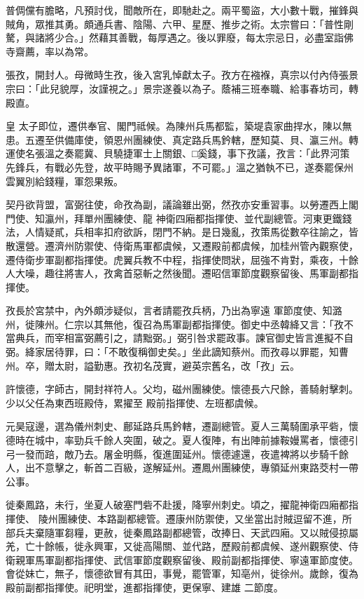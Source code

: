 \begin{pinyinscope}
 普倜儻有膽略，凡預討伐，聞敵所在，即馳赴之。兩平蜀盜，大小數十戰，摧鋒與賊角，眾推其勇。頗通兵書、陰陽、六甲、星歷、推步之術。太宗嘗曰：「普性剛驁，與諸將少合。」然藉其善戰，每厚遇之。後以罪廢，每太宗忌日，必盡室詣佛寺齋薦，率以為常。



 張孜，開封人。母微時生孜，後入宮乳悼獻太子。孜方在襁褓，真宗以付內侍張景宗曰：「此兒貌厚，汝謹視之。」景宗遂養以為子。蔭補三班奉職、給事春坊司，轉殿直。



 皇
 太子即位，遷供奉官、閣門祗候。為陳州兵馬都監，築堤袁家曲捍水，陳以無患。五遷至供備庫使，領恩州團練使、真定路兵馬鈐轄，歷知莫、貝、瀛三州。轉運使名張溫之奏罷冀、貝驍捷軍士上關銀、□奚錢，事下孜議，孜言：「此界河策先鋒兵，有戰必先登，故平時賜予異諸軍，不可罷。」溫之猶執不已，遂奏罷保州雲翼別給錢糧，軍怨果叛。



 契丹欲背盟，富弼往使，命孜為副，議論雖出弼，然孜亦安重習事。以勞遷西上閣門使、知瀛州，拜單州團練使、龍
 神衛四廂都指揮使、並代副總管。河東更鐵錢法，人情疑貳，兵相率扣府欲訴，閉門不納。是日幾亂，孜策馬從數卒往諭之，皆散還營。遷濟州防禦使、侍衛馬軍都虞候，又遷殿前都虞候，加桂州管內觀察使，遷侍衛步軍副都指揮使。虎翼兵教不中程，指揮使問狀，屈強不肯對，乘夜，十餘人大噪，趣往將害人，孜禽首惡斬之然後聞。遷昭信軍節度觀察留後、馬軍副都指揮使。



 孜長於宮禁中，內外頗涉疑似，言者請罷孜兵柄，乃出為寧遠
 軍節度使、知潞州，徙陳州。仁宗以其無他，復召為馬軍副都指揮使。御史中丞韓絳又言：「孜不當典兵，而宰相富弼薦引之，請黜弼。」弼引咎求罷政事。諫官御史皆言進擬不自弼。絳家居待罪，曰：「不敢復稱御史矣。」坐此謫知蔡州。而孜尋以罪罷，知曹州。卒，贈太尉，謚勤惠。孜初名茂實，避英宗舊名，改「孜」云。



 許懷德，字師古，開封祥符人。父均，磁州團練使。懷德長六尺餘，善騎射擊刺。少以父任為東西班殿侍，累擢至
 殿前指揮使、左班都虞候。



 元昊寇邊，選為儀州刺史、鄜延路兵馬鈐轄，遷副總管。夏人三萬騎圍承平砦，懷德時在城中，率勁兵千餘人突圍，破之。夏人復陣，有出陣前據鞍嫚罵者，懷德引弓一發而踣，敵乃去。屠金明縣，復進圍延州。懷德遽還，夜遣裨將以步騎千餘人，出不意擊之，斬首二百級，遂解延州。遷鳳州團練使，專領延州東路茭村一帶公事。



 徙秦鳳路，未行，坐夏人破塞門砦不赴援，降寧州刺史。頃之，擢龍神衛四廂都指揮使、
 陵州團練使、本路副都總管。遷康州防禦使，又坐當出討賊逗留不進，所部兵夫棄隨軍芻糧，更赦，徙秦鳳路副都總管，改捧日、天武四廂。又以賊侵掠屬羌，亡十餘帳，徙永興軍，又徙高陽關、並代路，歷殿前都虞候、遂州觀察使、侍衛親軍馬軍副都指揮使、武信軍節度觀察留後、殿前副都指揮使、寧遠軍節度使。會從妹亡，無子，懷德欲冒有其田，事覺，罷管軍，知亳州，徙徐州。歲餘，復為殿前副都指揮使。祀明堂，進都指揮使，更保寧、建雄
 二節度。




\end{pinyinscope}
